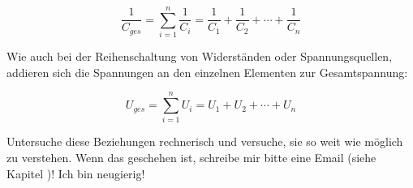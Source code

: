\begin{equation}
	\frac{1}{C_{ges}} = \sum\limits_{i=1}^n \frac{1}{C_i} = \frac{1}{C_1} + \frac{1}{C_2} + \cdots + \frac{1}{C_n}
\end{equation}

\noindent Wie auch bei der Reihenschaltung von Widerständen oder Spannungsquellen, addieren sich die Spannungen an den einzelnen Elementen zur Gesamtspannung:

\begin{equation}
	U_{ges} = \sum\limits_{i=1}^n U_i = U_1 + U_2 + \cdots + U_n
\end{equation}

\begin{Aufgabe}
Untersuche diese Beziehungen rechnerisch und versuche, sie so weit wie möglich zu verstehen. Wenn das geschehen ist, schreibe mir bitte eine Email (siehe Kapitel )! Ich bin neugierig!
\end{Aufgabe}

